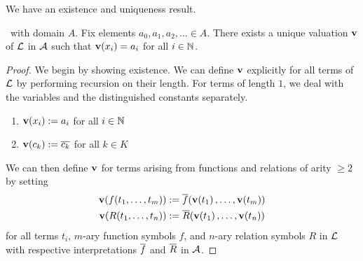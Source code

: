 We have an existence and uniqueness result.
\begin{boxlemma}
    \ with domain $A$. Fix elements $a_0, a_1, a_2, \ldots \in A$. There exists a unique valuation $\mathbf{v}$ of $\mathcal{L}$ in $\mathcal{A}$ such that $\mathbf{v}\!\left( x_i \right) = a_i$ for all $i \in \mathbb{N}$.
\end{boxlemma}
\begin{proof}
    We begin by showing existence. We can define $\mathbf{v}$ explicitly for all terms of $\mathcal{L}$ by performing recursion on their length. For terms of length $1$, we deal with the variables and the distinguished constants separately.
    \begin{enumerate}
        \item $\mathbf{v}\!\left( x_i \right) := a_i$ for all $i \in \mathbb{N}$
        \item $\mathbf{v}\!\left( c_k \right) := \overline{c_k}$ for all $k \in K$
    \end{enumerate}
    We can then define $\mathbf{v}$ for terms arising from functions and relations of arity $\geq 2$ by setting
    \begin{align*}
        \vof{\fof{t_1, \ldots, t_m}} &:= \fbof{\vof{t_1}, \ldots, \vof{t_m}} \\
        \vof{\Rof{t_1, \ldots, t_n}} &:= \Rbof{\vof{t_1}, \ldots, \vof{t_n}}
    \end{align*}
    for all terms $t_i$, $m$-ary function symbols $f$, and $n$-ary relation symbols $R$ in $\mathcal{L}$ with respective interpretations $\overline{f}$ and $\overline{R}$ in $\mathcal{A}$.
\end{proof}
